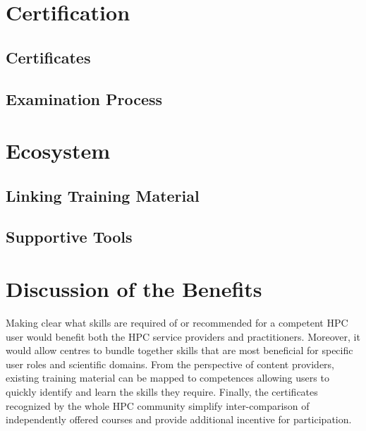 \documentclass[jocse]{jocseart}
\begin{document}


\section{Certification}

\subsection{Certificates}

\subsection{Examination Process}

\section{Ecosystem}

\subsection{Linking Training Material}

\subsection{Supportive Tools}

\section{Discussion of the Benefits}

Making clear what skills are required of or recommended for a competent HPC user would benefit both the HPC service providers and practitioners.
Moreover, it would allow centres to bundle together skills that are most beneficial for specific user roles and scientific domains.
From the perspective of content providers, existing training material can be mapped to competences allowing users to quickly identify and learn the skills they require.
Finally, the certificates recognized by the whole HPC community simplify inter-comparison of independently offered courses and provide additional incentive for participation.
\end{document}

